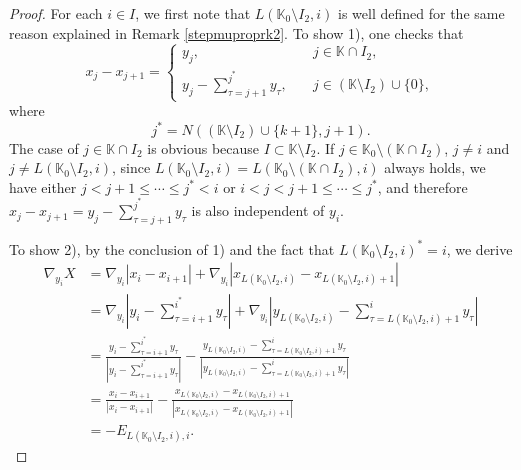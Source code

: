 \documentclass[11pt,reqno]{amsart}
\numberwithin{equation}{section}
\theoremstyle{definition}
\begin{document}
\begin{proof}
	For each $i\in I$, we first note that $L(\mathbb{K}_0\setminus I_2,i)$ is well defined for the same reason explained in Remark \ref{stepmuproprk2}. To show 1), one checks that
	\begin{equation*}
		x_j-x_{j+1}=\begin{cases}
			y_j,&j\in\mathbb{K}\cap I_2,\\
			y_j-\sum_{\tau=j+1}^{j^*}y_\tau,\quad&j\in(\mathbb{K}\setminus I_2)\cup\{0\},
		\end{cases}
	\end{equation*}
	where
	\begin{equation*}
		j^*=N((\mathbb{K}\setminus I_2)\cup\{k+1\},j+1).
	\end{equation*}
	The case of $j\in\mathbb{K}\cap I_2$ is obvious because $I\subset\mathbb{K}\setminus I_2$. If $j\in\mathbb{K}_0\setminus(\mathbb{K}\cap I_2)$, $j\neq i$ and $j\neq L(\mathbb{K}_0\setminus I_2,i)$, since $L(\mathbb{K}_0\setminus I_2,i)=L(\mathbb{K}_0\setminus(\mathbb{K}\cap I_2),i)$ always holds, we have either $j<j+1\leq\cdots\leq j^*<i$ or $i<j<j+1\leq\cdots\leq j^*$, and therefore $x_j-x_{j+1}=y_j-\sum_{\tau=j+1}^{j^*}y_\tau$ is also independent of $y_i$.
	
	To show 2), by the conclusion of 1) and the fact that $L(\mathbb{K}_0\setminus I_2,i)^*=i$, we derive
	\begin{equation}\label{nablaX}
		\begin{split}
			\nabla_{y_i}X&=\nabla_{y_i}|x_i-x_{i+1}|+\nabla_{y_i}|x_{L(\mathbb{K}_0\setminus I_2,i)}-x_{L(\mathbb{K}_0\setminus I_2,i)+1}|\\
			&=\nabla_{y_i}\left|\mbox{$y_i-\sum_{\tau=i+1}^{i^*}y_\tau$}\right|+\nabla_{y_i}\left|y_{L(\mathbb{K}_0\setminus I_2,i)}-\mbox{$\sum_{\tau=L(\mathbb{K}_0\setminus I_2,i)+1}^{i}y_\tau$}\right|\\
			&=\frac{\mbox{$y_i-\sum_{\tau=i+1}^{i^*}y_\tau$}}{\left|\mbox{$y_i-\sum_{\tau=i+1}^{i^*}y_\tau$}\right|}-\frac{y_{L(\mathbb{K}_0\setminus I_2,i)}-\mbox{$\sum_{\tau=L(\mathbb{K}_0\setminus I_2,i)+1}^{i}y_\tau$}}{\left|y_{L(\mathbb{K}_0\setminus I_2,i)}-\mbox{$\sum_{\tau=L(\mathbb{K}_0\setminus I_2,i)+1}^{i}y_\tau$}\right|}\\
			&=\frac{x_i-x_{i+1}}{|x_i-x_{i+1}|}-\frac{x_{L(\mathbb{K}_0\setminus I_2,i)}-x_{L(\mathbb{K}_0\setminus I_2,i)+1}}{|x_{L(\mathbb{K}_0\setminus I_2,i)}-x_{L(\mathbb{K}_0\setminus I_2,i)+1}|}\\
			&=-E_{L(\mathbb{K}_0\setminus I_2,i),i}.
		\end{split}
	\end{equation}
\end{proof}
\end{document}
